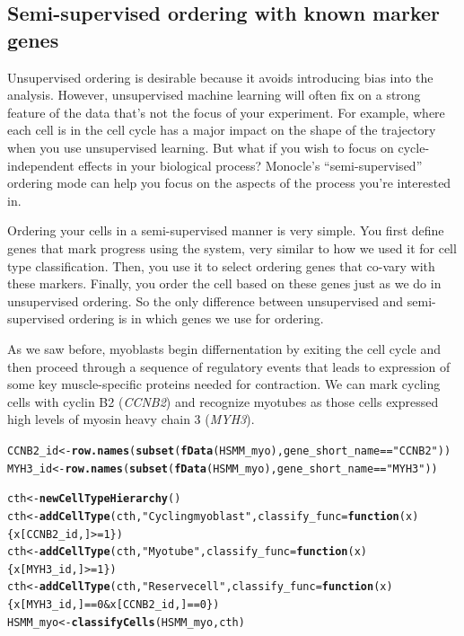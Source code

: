\documentclass[10pt,oneside]{article}\usepackage[]{graphicx}\usepackage[]{color}
\makeatletter
\newcommand{\hlnum}[1]{\textcolor[rgb]{0.686,0.059,0.569}{#1}}%
\newcommand{\hlstr}[1]{\textcolor[rgb]{0.192,0.494,0.8}{#1}}%
\newcommand{\hlopt}[1]{\textcolor[rgb]{0,0,0}{#1}}%
\newcommand{\hlstd}[1]{\textcolor[rgb]{0.345,0.345,0.345}{#1}}%
\newcommand{\hlkwa}[1]{\textcolor[rgb]{0.161,0.373,0.58}{\textbf{#1}}}%
\newcommand{\hlkwb}[1]{\textcolor[rgb]{0.69,0.353,0.396}{#1}}%
\newcommand{\hlkwc}[1]{\textcolor[rgb]{0.333,0.667,0.333}{#1}}%
\newcommand{\hlkwd}[1]{\textcolor[rgb]{0.737,0.353,0.396}{\textbf{#1}}}%
\newenvironment{kframe}{%
 \def\at@end@of@kframe{}%
 \ifinner\ifhmode%
  \def\at@end@of@kframe{\end{minipage}}%
  \begin{minipage}{\columnwidth}%
 \fi\fi%
 \def\FrameCommand##1{\hskip\@totalleftmargin \hskip-\fboxsep
 \colorbox{shadecolor}{##1}\hskip-\fboxsep
     \hskip-\linewidth \hskip-\@totalleftmargin \hskip\columnwidth}%
 \MakeFramed {\advance\hsize-\width
   \@totalleftmargin\z@ \linewidth\hsize
   \@setminipage}}%
 {\par\unskip\endMakeFramed%
 \at@end@of@kframe}
\newenvironment{knitrout}{}{} %
\makeatother
\begin{document}
\subsection{Semi-supervised ordering with known marker genes}

Unsupervised ordering is desirable because it avoids introducing bias into the analysis. However, unsupervised machine learning will often fix on a strong feature of the data that's not the focus of your experiment. For example, where each cell is in the cell cycle has a major impact on the shape of the trajectory when you use unsupervised learning. But what if you wish to focus on cycle-independent effects in your biological process? Monocle's ``semi-supervised'' ordering mode can help you focus on the aspects of the process you're interested in.

Ordering your cells in a semi-supervised manner is very simple. You first define genes that mark progress using the  system, very similar to how we used it for cell type classification. Then, you use it to select ordering genes that co-vary with these markers. Finally, you order the cell based on these genes just as we do in unsupervised ordering. So the only difference between unsupervised and semi-supervised ordering is in which genes we use for ordering.

As we saw before, myoblasts begin differnentation by exiting the cell cycle and then proceed through a sequence of regulatory events that leads to expression of some key muscle-specific proteins needed for contraction. We can mark cycling cells with cyclin B2 (\emph{CCNB2}) and recognize myotubes as those cells expressed high levels of myosin heavy chain 3 (\emph{MYH3}).
\begin{knitrout}
\color{fgcolor}\begin{kframe}
\begin{alltt}
\hlstd{CCNB2_id} \hlkwb{<-} \hlkwd{row.names}\hlstd{(}\hlkwd{subset}\hlstd{(}\hlkwd{fData}\hlstd{(HSMM_myo), gene_short_name} \hlopt{==} \hlstr{"CCNB2"}\hlstd{))}
\hlstd{MYH3_id} \hlkwb{<-} \hlkwd{row.names}\hlstd{(}\hlkwd{subset}\hlstd{(}\hlkwd{fData}\hlstd{(HSMM_myo), gene_short_name} \hlopt{==} \hlstr{"MYH3"}\hlstd{))}

\hlstd{cth} \hlkwb{<-} \hlkwd{newCellTypeHierarchy}\hlstd{()}
\hlstd{cth} \hlkwb{<-} \hlkwd{addCellType}\hlstd{(cth,} \hlstr{"Cycling myoblast"}\hlstd{,} \hlkwc{classify_func}\hlstd{=}\hlkwa{function}\hlstd{(}\hlkwc{x}\hlstd{) \{x[CCNB2_id,]} \hlopt{>=} \hlnum{1}\hlstd{\})}
\hlstd{cth} \hlkwb{<-} \hlkwd{addCellType}\hlstd{(cth,} \hlstr{"Myotube"}\hlstd{,} \hlkwc{classify_func}\hlstd{=}\hlkwa{function}\hlstd{(}\hlkwc{x}\hlstd{) \{x[MYH3_id,]} \hlopt{>=}\hlnum{1}\hlstd{\})}
\hlstd{cth} \hlkwb{<-} \hlkwd{addCellType}\hlstd{(cth,} \hlstr{"Reserve cell"}\hlstd{,} \hlkwc{classify_func}\hlstd{=}\hlkwa{function}\hlstd{(}\hlkwc{x}\hlstd{) \{x[MYH3_id,]} \hlopt{==} \hlnum{0} \hlopt{&} \hlstd{x[CCNB2_id,]} \hlopt{==} \hlnum{0}\hlstd{\})}
\hlstd{HSMM_myo} \hlkwb{<-} \hlkwd{classifyCells}\hlstd{(HSMM_myo, cth)}
\end{alltt}
\end{kframe}
\end{knitrout}
\end{document}
